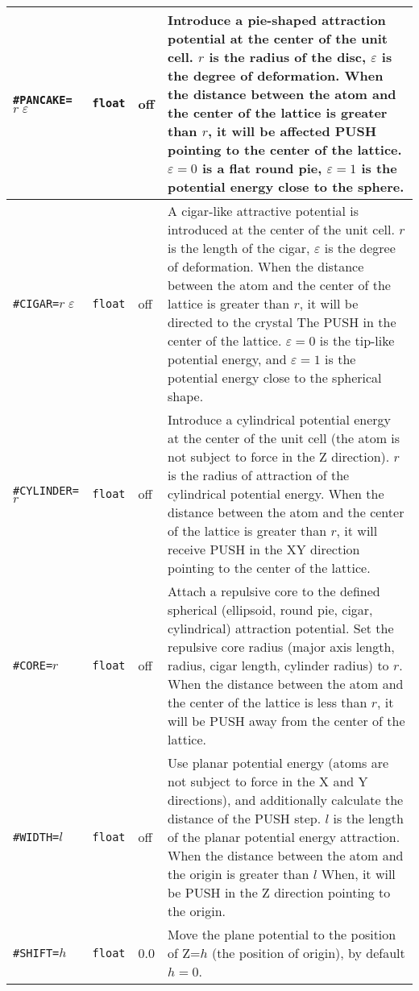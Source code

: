 \documentclass[a4paper, 10pt]{article}
\begin{document}
\begin{center}
\begin{longtable}{m{11em}|m{4em}<{\centering}|m{3em}<{\centering}|m{15em}}
\midrule
\verb|#PANCAKE=|\(r\;\varepsilon\) & \verb|float|  & off & Introduce a pie-shaped attraction potential at the center of the unit cell. \(r\) is the radius of the disc, \(\varepsilon\) is the degree of deformation. When the distance between the atom and the center of the lattice is greater than \(r\), it will be affected PUSH pointing to the center of the lattice. \(\varepsilon=0\) is a flat round pie, \(\varepsilon=1\) is the potential energy close to the sphere. \\
\midrule
\verb|#CIGAR=|\(r\;\varepsilon\) & \verb|float| & off & A cigar-like attractive potential is introduced at the center of the unit cell. \(r\) is the length of the cigar, \(\varepsilon\) is the degree of deformation. When the distance between the atom and the center of the lattice is greater than \(r\), it will be directed to the crystal The PUSH in the center of the lattice. \(\varepsilon=0\) is the tip-like potential energy, and \(\varepsilon=1\) is the potential energy close to the spherical shape.\\
\midrule
\verb|#CYLINDER=|\(r\) & \verb|float| & off & Introduce a cylindrical potential energy at the center of the unit cell (the atom is not subject to force in the Z direction). \(r\) is the radius of attraction of the cylindrical potential energy. When the distance between the atom and the center of the lattice is greater than \(r\), it will receive PUSH in the XY direction pointing to the center of the lattice.\\
\midrule
\verb|#CORE=|\(r\) & \verb|float| & off & Attach a repulsive core to the defined spherical (ellipsoid, round pie, cigar, cylindrical) attraction potential. Set the repulsive core radius (major axis length, radius, cigar length, cylinder radius) to \(r\). When the distance between the atom and the center of the lattice is less than \(r\), it will be PUSH away from the center of the lattice.\\
\midrule
\verb|#WIDTH=|\(l\)& \verb|float| & off & Use planar potential energy (atoms are not subject to force in the X and Y directions), and additionally calculate the distance of the PUSH step. \(l\) is the length of the planar potential energy attraction. When the distance between the atom and the origin is greater than \(l\) When, it will be PUSH in the Z direction pointing to the origin.\\
\midrule
\verb|#SHIFT=|\(h\)& \verb|float|& 0.0  & Move the plane potential to the position of Z=\(h\) (the position of origin), by default \(h=0\).\\
\bottomrule
\end{longtable}
\end{center}
\end{document}
